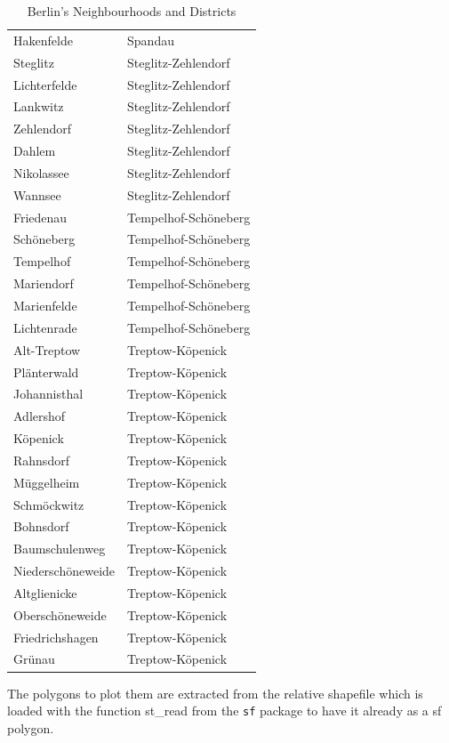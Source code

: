 \begin{table}[H]
\begin{tabular}{ll}
  Hakenfelde & Spandau \\ 
  Steglitz & Steglitz-Zehlendorf \\ 
  Lichterfelde & Steglitz-Zehlendorf \\ 
  Lankwitz & Steglitz-Zehlendorf \\ 
  Zehlendorf & Steglitz-Zehlendorf \\ 
  Dahlem & Steglitz-Zehlendorf \\ 
  Nikolassee & Steglitz-Zehlendorf \\ 
  Wannsee & Steglitz-Zehlendorf \\ 
  Friedenau & Tempelhof-Schöneberg \\ 
  Schöneberg & Tempelhof-Schöneberg \\ 
  Tempelhof & Tempelhof-Schöneberg \\ 
  Mariendorf & Tempelhof-Schöneberg \\ 
  Marienfelde & Tempelhof-Schöneberg \\ 
  Lichtenrade & Tempelhof-Schöneberg \\ 
  Alt-Treptow & Treptow-Köpenick \\ 
  Plänterwald & Treptow-Köpenick \\ 
  Johannisthal & Treptow-Köpenick \\ 
  Adlershof & Treptow-Köpenick \\ 
  Köpenick & Treptow-Köpenick \\ 
  Rahnsdorf & Treptow-Köpenick \\ 
  Müggelheim & Treptow-Köpenick \\ 
  Schmöckwitz & Treptow-Köpenick \\ 
  Bohnsdorf & Treptow-Köpenick \\ 
  Baumschulenweg & Treptow-Köpenick \\ 
  Niederschöneweide & Treptow-Köpenick \\ 
  Altglienicke & Treptow-Köpenick \\ 
  Oberschöneweide & Treptow-Köpenick \\ 
  Friedrichshagen & Treptow-Köpenick \\ 
  Grünau & Treptow-Köpenick \\ 
   \hline \hline
\end{tabular}
\caption{Berlin's Neighbourhoods and Districts}
\end{table}

The polygons to plot them are extracted from the relative shapefile which is loaded with the function st\_read from the \texttt{sf} package to have it already as a sf polygon. 

